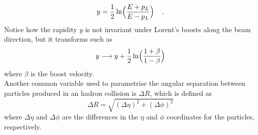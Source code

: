 \begin{equation}
y = \frac{1}{2}\ln\Bigl(\frac{E + p_L}{E - p_L}\Bigr) \hspace{0.4cm} \text{.}
\end{equation}
Notice how the rapidity $y$ is not invariant under Lorent's boosts along the beam direction, but it transforms such as
\begin{equation}
y \longrightarrow y + \frac{1}{2}\ln\Bigl(\frac{1 + \beta}{1 - \beta}\Bigr)
\end{equation}
where $\beta$ is the boost velocity.
\\
Another common variable used to parametrise the angular separation between particles produced in an hadron collision is $\Delta R$, which is defined as
\begin{equation}
\Delta R = \sqrt{(\Delta\eta)^2 + (\Delta\phi)^2}
\end{equation}
where $\Delta\eta$ and $\Delta\phi$ are the differences in the $\eta$ and $\phi$ coordinates for the particles, respectively.